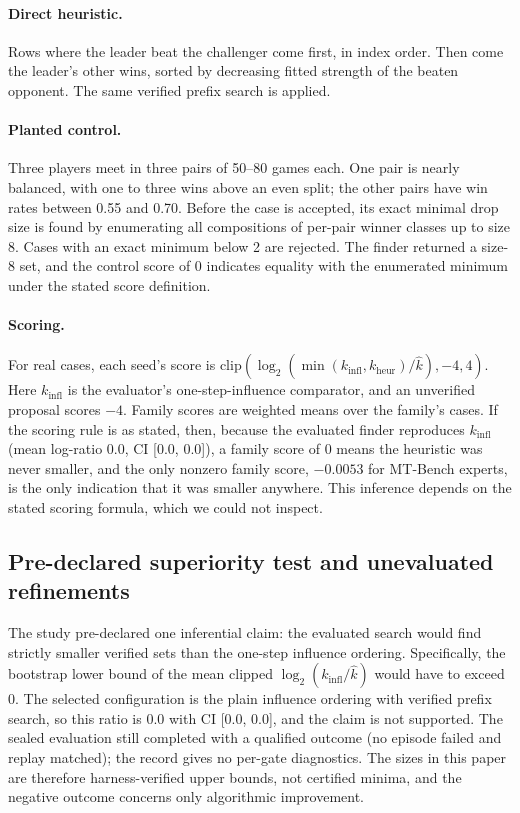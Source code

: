 \documentclass{article}
\newcommand{\kver}{\hat{k}}
\begin{document}
\paragraph{Direct heuristic.}
Rows where the leader beat the challenger come first, in index order. Then come the leader's other wins, sorted by decreasing fitted strength of the beaten opponent. The same verified prefix search is applied.

\paragraph{Planted control.}
Three players meet in three pairs of 50--80 games each. One pair is nearly balanced, with one to three wins above an even split; the other pairs have win rates between 0.55 and 0.70. Before the case is accepted, its exact minimal drop size is found by enumerating all compositions of per-pair winner classes up to size 8. Cases with an exact minimum below 2 are rejected. The finder returned a size-8 set, and the control score of 0 indicates equality with the enumerated minimum under the stated score definition.

\paragraph{Scoring.}
For real cases, each seed's score is $\mathrm{clip}(\log_2(\min(k_{\text{infl}},k_{\text{heur}})/\kver),-4,4)$. Here $k_{\text{infl}}$ is the evaluator's one-step-influence comparator, and an unverified proposal scores $-4$. Family scores are weighted means over the family's cases. If the scoring rule is as stated, then, because the evaluated finder reproduces $k_{\text{infl}}$ (mean log-ratio 0.0, CI [0.0, 0.0]), a family score of 0 means the heuristic was never smaller, and the only nonzero family score, $-0.0053$ for MT-Bench experts, is the only indication that it was smaller anywhere. This inference depends on the stated scoring formula, which we could not inspect.

\subsection{Pre-declared superiority test and unevaluated refinements}
\label{app:negative}

The study pre-declared one inferential claim: the evaluated search would find strictly smaller verified sets than the one-step influence ordering. Specifically, the bootstrap lower bound of the mean clipped $\log_2(k_{\text{infl}}/\kver)$ would have to exceed 0. The selected configuration is the plain influence ordering with verified prefix search, so this ratio is 0.0 with CI [0.0, 0.0], and the claim is not supported. The sealed evaluation still completed with a qualified outcome (no episode failed and replay matched); the record gives no per-gate diagnostics. The sizes in this paper are therefore harness-verified upper bounds, not certified minima, and the negative outcome concerns only algorithmic improvement.
\end{document}
